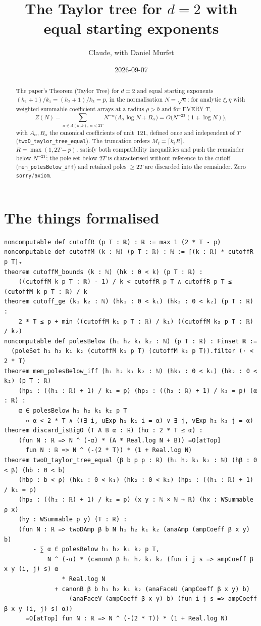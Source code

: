 \documentclass[11pt]{article}
\title{The Taylor tree for $d=2$ with equal starting exponents}
\author{Claude, with Daniel Murfet}
\date{2026-09-07}
\begin{document}
\maketitle
\sloppy

\begin{abstract}
The paper's Theorem (Taylor Tree) for $d=2$ and equal starting exponents
$(h_1+1)/k_1=(h_2+1)/k_2=p$, in the normalisation $N=\sqrt n$: for analytic $\xi,\eta$ with
weighted-summable coefficient arrays at a radius $\rho>b$ and for EVERY $T$,
\[
Z(N)-\sum_{\alpha\in\Lambda(h,k),\ \alpha<2T}N^{-\alpha}\bigl(A_\alpha\log N+B_\alpha\bigr)
=O\bigl(N^{-2T}(1+\log N)\bigr),
\]
with $A_\alpha,B_\alpha$ the canonical coefficients of unit~121, defined once and independent of
$T$ (\texttt{twoD\_taylor\_tree\_equal}). The truncation orders $M_\ell=\lceil k_\ell R\rceil$,
$R=\max(1,2T-p)$, satisfy both compatibility inequalities and push the remainder below $N^{-2T}$;
the pole set below $2T$ is characterised without reference to the cutoff
(\texttt{mem\_polesBelow\_iff}) and retained poles $\ge2T$ are discarded into the remainder.
Zero \texttt{sorry}/\texttt{axiom}.
\end{abstract}

\section{The things formalised}
{\small
\begin{verbatim}
noncomputable def cutoffR (p T : ℝ) : ℝ := max 1 (2 * T - p)
noncomputable def cutoffM (k : ℕ) (p T : ℝ) : ℕ := ⌈(k : ℝ) * cutoffR p T⌉₊
theorem cutoffM_bounds (k : ℕ) (hk : 0 < k) (p T : ℝ) :
    ((cutoffM k p T : ℝ) - 1) / k < cutoffR p T ∧ cutoffR p T ≤ (cutoffM k p T : ℝ) / k
theorem cutoff_ge (k₁ k₂ : ℕ) (hk₁ : 0 < k₁) (hk₂ : 0 < k₂) (p T : ℝ) :
    2 * T ≤ p + min ((cutoffM k₁ p T : ℝ) / k₁) ((cutoffM k₂ p T : ℝ) / k₂)
noncomputable def polesBelow (h₁ h₂ k₁ k₂ : ℕ) (p T : ℝ) : Finset ℝ :=
  (poleSet h₁ h₂ k₁ k₂ (cutoffM k₁ p T) (cutoffM k₂ p T)).filter (· < 2 * T)
theorem mem_polesBelow_iff (h₁ h₂ k₁ k₂ : ℕ) (hk₁ : 0 < k₁) (hk₂ : 0 < k₂) (p T : ℝ)
    (hp₁ : ((h₁ : ℝ) + 1) / k₁ = p) (hp₂ : ((h₂ : ℝ) + 1) / k₂ = p) (α : ℝ) :
    α ∈ polesBelow h₁ h₂ k₁ k₂ p T
      ↔ α < 2 * T ∧ ((∃ i, uExp h₁ k₁ i = α) ∨ ∃ j, vExp h₂ k₂ j = α)
theorem discard_isBigO (T A B α : ℝ) (hα : 2 * T ≤ α) :
    (fun N : ℝ => N ^ (-α) * (A * Real.log N + B)) =O[atTop]
      fun N : ℝ => N ^ (-(2 * T)) * (1 + Real.log N)
theorem twoD_taylor_tree_equal (β b p ρ : ℝ) (h₁ h₂ k₁ k₂ : ℕ) (hβ : 0 < β) (hb : 0 < b)
    (hbρ : b < ρ) (hk₁ : 0 < k₁) (hk₂ : 0 < k₂) (hp₁ : ((h₁ : ℝ) + 1) / k₁ = p)
    (hp₂ : ((h₂ : ℝ) + 1) / k₂ = p) (x y : ℕ × ℕ → ℝ) (hx : WSummable ρ x)
    (hy : WSummable ρ y) (T : ℝ) :
    (fun N : ℝ => twoDAmp β b N h₁ h₂ k₁ k₂ (anaAmp (ampCoeff β x y) b)
        - ∑ α ∈ polesBelow h₁ h₂ k₁ k₂ p T,
            N ^ (-α) * (canonA β h₁ h₂ k₁ k₂ (fun i j s => ampCoeff β x y (i, j) s) α
                * Real.log N
              + canonB β b h₁ h₂ k₁ k₂ (anaFaceU (ampCoeff β x y) b)
                  (anaFaceV (ampCoeff β x y) b) (fun i j s => ampCoeff β x y (i, j) s) α))
      =O[atTop] fun N : ℝ => N ^ (-(2 * T)) * (1 + Real.log N)
\end{verbatim}
}
\end{document}
